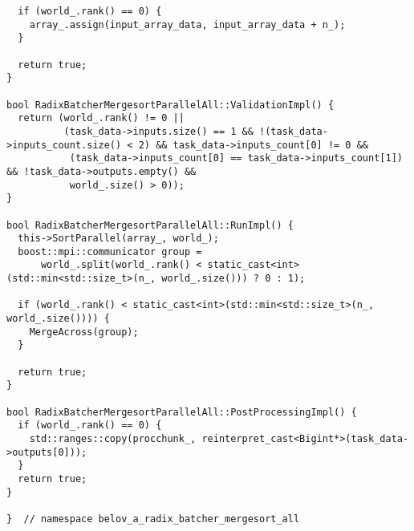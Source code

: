 \documentclass[a4paper,12pt]{article}
\begin{document}
\begin{lstlisting}
  if (world_.rank() == 0) {
    array_.assign(input_array_data, input_array_data + n_);
  }

  return true;
}

bool RadixBatcherMergesortParallelAll::ValidationImpl() {
  return (world_.rank() != 0 ||
          (task_data->inputs.size() == 1 && !(task_data->inputs_count.size() < 2) && task_data->inputs_count[0] != 0 &&
           (task_data->inputs_count[0] == task_data->inputs_count[1]) && !task_data->outputs.empty() &&
           world_.size() > 0));
}

bool RadixBatcherMergesortParallelAll::RunImpl() {
  this->SortParallel(array_, world_);
  boost::mpi::communicator group =
      world_.split(world_.rank() < static_cast<int>(std::min<std::size_t>(n_, world_.size())) ? 0 : 1);

  if (world_.rank() < static_cast<int>(std::min<std::size_t>(n_, world_.size()))) {
    MergeAcross(group);
  }

  return true;
}

bool RadixBatcherMergesortParallelAll::PostProcessingImpl() {
  if (world_.rank() == 0) {
    std::ranges::copy(procchunk_, reinterpret_cast<Bigint*>(task_data->outputs[0]));
  }
  return true;
}

}  // namespace belov_a_radix_batcher_mergesort_all
\end{lstlisting}
\end{document}
